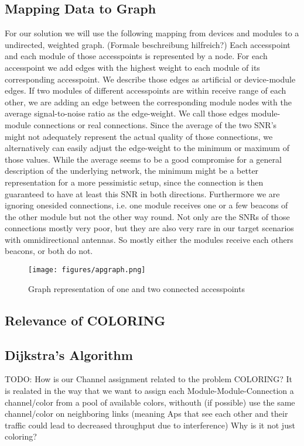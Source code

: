    \subsection{Mapping Data to Graph}
    For our solution we will use the following mapping from devices and modules to a undirected, weighted graph. (Formale beschreibung hilfreich?)
    Each accesspoint and each module of those accesspoints is represented by a node.
    For each accesspoint we add edges with the highest weight to each module of its corresponding accesspoint. 
    We describe those edges as artificial or device-module edges.
    If two modules of different accesspoints are within receive range of each other, 
    we are adding an edge between the corresponding module nodes with the average signal-to-noise ratio as the edge-weight.
    We call those edges module-module connections or real connections.
    Since the average of the two SNR's might not adequately represent the actual quality of those connections,
    we alternatively can easily adjust the edge-weight to the minimum or maximum of those values.
    While the average seems to be a good compromise for a general description of the underlying network, the minimum might be a better representation for 
    a more pessimistic setup, since the connection is then guaranteed to have at least this SNR in both directions. 
    Furthermore we are ignoring onesided connections, i.e. one module receives one or a few beacons of the other module but not the other way round.
    Not only are the SNRs of those connections mostly very poor, but they are also very rare in our target scenarios with omnidirectional antennas.
    So mostly either the modules receive each others beacons, or both do not.
    \begin{figure}[t]
      \centering
      \texttt{[image: figures/apgraph.png]}
      \caption{Graph representation of one and two connected accesspoints}
      \label{fig:apgraph}
    \end{figure}
   \subsection{Relevance of COLORING}
   \subsection{Dijkstra's Algorithm}
   TODO: How is our Channel assignment related to the problem COLORING?
    It is realated in the way that we want to assign each Module-Module-Connection a channel/color from a pool of available colors, withouth (if possible) use the same channel/color on neighboring links (meaning Aps that see each other and their traffic could lead to decreased throughput due to interference)
    Why is it not just coloring?
